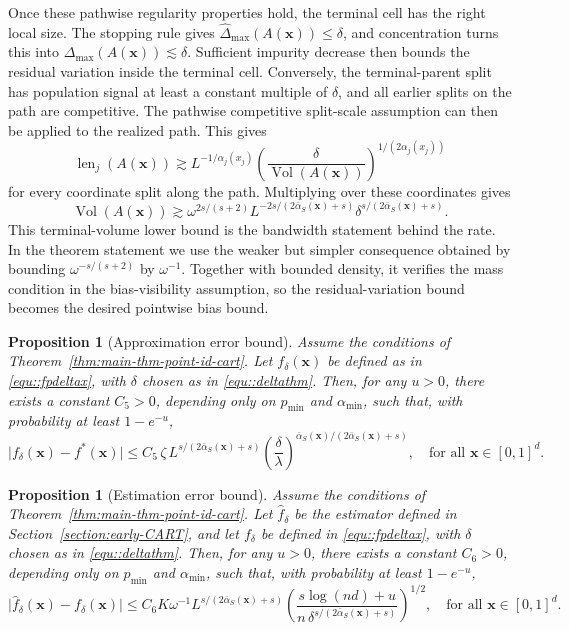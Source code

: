 \documentclass[11pt]{article}
\theoremstyle{plain}
\newtheorem{proposition}[theorem]{Proposition}
\theoremstyle{definition}
\theoremstyle{remark}
\theoremstyle{plain}
\newcommand{\bx}{\mathbf{x}}
\DeclareMathOperator{\Vol}{Vol}
\DeclareMathOperator{\len}{len}
\newcommand{\1}{\mathbbm{1}}
\begin{document}
Once these pathwise regularity properties hold, the terminal cell has the right local size. The stopping rule gives
$\widehat\Delta_{\max}(A(\bx))\le\delta$, and concentration turns this into
$\Delta_{\max}(A(\bx))\lesssim\delta$. Sufficient impurity decrease then bounds the residual variation inside the terminal cell. Conversely, the terminal-parent split has population signal at least a constant multiple of $\delta$, and all earlier splits on the path are competitive. The pathwise competitive split-scale assumption can then be applied to the realized path. This gives
\[
\len_j(A(\bx))
\gtrsim
L^{-1/\alpha_j(x_j)}
\left(\frac{\delta}{\Vol(A(\bx))}\right)^{1/(2\alpha_j(x_j))}
\]
for every coordinate split along the path. Multiplying over these coordinates gives
\[
\Vol(A(\bx))
\gtrsim
\omega^{2s/(s+2)}
L^{-2s/(2\bar\alpha_S(\bx)+s)}
\delta^{s/(2\bar\alpha_S(\bx)+s)}.
\]
This terminal-volume lower bound is the bandwidth statement behind the rate. In the theorem statement we use the weaker but simpler consequence obtained by bounding $\omega^{-s/(s+2)}$ by $\omega^{-1}$.
Together with bounded density, it verifies the mass condition in the bias-visibility assumption, so the residual-variation bound becomes the desired pointwise bias bound.

\begin{proposition}[Approximation error bound]\label{pro::approximation}
Assume the conditions of Theorem~\ref{thm:main-thm-point-id-cart}. Let $f_{\delta}(\bx)$ be defined as in \eqref{equ::fpdeltax}, with $\delta$ chosen as in \eqref{equ::deltathm}. 
Then, for any $u>0$, there exists a constant $C_5>0$, depending only on $p_{\min}$ and $\alpha_{\min}$, such that, with probability at least $1-e^{-u}$,
\[
\bigl|f_{\delta}(\bx)-f^*(\bx)\bigr|
\le
C_5\,
\zeta\,
L^{s/(2\bar\alpha_S(\bx)+s)}
\left(\frac{\delta}{\lambda}\right)^{
\bar\alpha_S(\bx)/(2\bar\alpha_S(\bx)+s)},
\quad \text{for all } \bx\in[0,1]^d.
\]
\end{proposition}

\begin{proposition}[Estimation error bound]\label{pro::estimation}
Assume the conditions of Theorem~\ref{thm:main-thm-point-id-cart}. Let $\hat f_\delta$ be the estimator defined in Section~\ref{section:early-CART}, and let $f_\delta$ be defined in \eqref{equ::fpdeltax}, with $\delta$ chosen as in \eqref{equ::deltathm}. 
Then, for any $u>0$, there exists a constant $C_6>0$, depending only on $p_{\min}$ and $\alpha_{\min}$, such that, with probability at least $1-e^{-u}$,
\[
\bigl|\hat{f}_{\delta}(\bx) - f_{\delta}(\bx)\bigr|
\le 
C_6 K
\omega^{-1}
L^{s/(2\bar\alpha_S(\bx)+s)}
\left(
\frac{s\log(nd)+u}
{n\,\delta^{s/(2\bar\alpha_S(\bx)+s)}}
\right)^{1/2},
\quad \text{for all } \bx \in [0,1]^d.
\]
\end{proposition}
\end{document}
